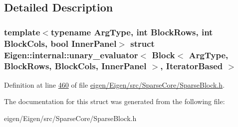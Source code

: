 \subsection{Detailed Description}
\subsubsection*{template$<$typename Arg\+Type, int Block\+Rows, int Block\+Cols, bool Inner\+Panel$>$\newline
struct Eigen\+::internal\+::unary\+\_\+evaluator$<$ Block$<$ Arg\+Type, Block\+Rows, Block\+Cols, Inner\+Panel $>$, Iterator\+Based $>$}



Definition at line \hyperlink{eigen_2_eigen_2src_2_sparse_core_2_sparse_block_8h_source_l00460}{460} of file \hyperlink{eigen_2_eigen_2src_2_sparse_core_2_sparse_block_8h_source}{eigen/\+Eigen/src/\+Sparse\+Core/\+Sparse\+Block.\+h}.



The documentation for this struct was generated from the following file\+:\begin{DoxyCompactItemize}
\item 
eigen/\+Eigen/src/\+Sparse\+Core/\+Sparse\+Block.\+h\end{DoxyCompactItemize}
